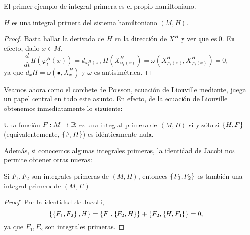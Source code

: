 El primer ejemplo de integral primera es el propio hamiltoniano.
  \begin{prop}
    $H$ es una integral primera del sistema hamiltoniano $(M,H)$.
  \end{prop}
  \begin{proof}
    Basta hallar la derivada de $H$ en la dirección de $X^H$ y ver que es 0. En efecto, dado $x \in M$,
    \begin{equation*}
      \frac{d}{dt}H\left( \varphi_t^H(x) \right)=d_{\varphi_t^H(x)}H(X_{\varphi_t(x)}^H) = \omega(X_{\varphi_t(x)}^H,X_{\varphi_t(x)}^H)=0,
    \end{equation*}
    ya que $d_xH=\omega(\bullet,X_x^H)$ y $\omega$ es antisimétrica.
  \end{proof}

Veamos ahora como el corchete de Poisson, ecuación de Liouville mediante, juega un papel central en todo este asunto. En efecto, de la ecuación de Liouville obtenemos inmediatamente lo siguiente:
\begin{prop}
  Una función $F:M \rightarrow \mathbb{R}$ es una integral primera de $(M,H)$ si y sólo si $\left\lbrace H,F\right\rbrace$ (equivalentemente, $\left\lbrace F,H\right\rbrace$) es idénticamente nula.
\end{prop}

Además, si conocemos algunas integrales primeras, la identidad de Jacobi nos permite obtener otras nuevas:
\begin{prop}
  Si $F_1, F_2$ son integrales primeras de $(M,H)$, entonces $\left\lbrace F_1,F_2\right\rbrace$ es también una integral primera de $(M,H)$.
\end{prop}
\begin{proof}
  Por la identidad de Jacobi,
  \begin{equation*}
    \left\lbrace \left\lbrace F_1,F_2\right\rbrace, H\right\rbrace= \left\lbrace F_1, \left\lbrace F_2,H\right\rbrace\right\rbrace + \left\lbrace F_2, \left\lbrace H,F_1\right\rbrace \right\rbrace=0,
  \end{equation*}
  ya que $F_1,F_2$ son integrales primeras.
\end{proof}

